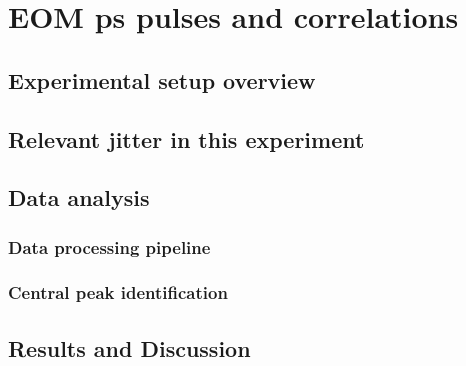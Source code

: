 \chapter{EOM ps pulses and correlations}



\section{Experimental setup overview}
\section{Relevant jitter in this experiment}
\section{Data analysis}
\subsection{Data processing pipeline}
\subsection{Central peak identification}
\section{Results and Discussion}